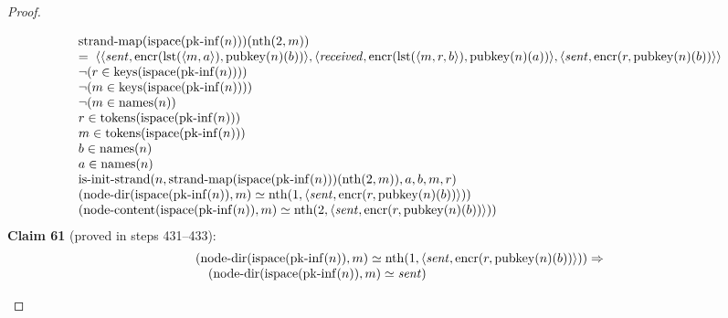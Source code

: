 \documentclass[11pt]{article}
\theoremstyle{plain}
\begin{document}
\begin{proof}
\begin{itemize}[leftmargin=2.8em, itemsep=4pt, parsep=1pt]
\begin{itemize}[leftmargin=2.8em, itemsep=4pt, parsep=1pt]
\begin{equation*}
\begin{array}{@{}l@{}}
\begin{array}{@{}l@{}} \operatorname{strand\text{-}map}(\operatorname{ispace}(\operatorname{pk\text{-}inf}(n)))(\operatorname{nth}(2, m)) \\ =\; \langle \langle \mathit{sent}, \operatorname{encr}(\operatorname{lst}(\langle m, a \rangle), \operatorname{pubkey}(n)(b)) \rangle, \langle \mathit{received}, \operatorname{encr}(\operatorname{lst}(\langle m, r, b \rangle), \operatorname{pubkey}(n)(a)) \rangle, \langle \mathit{sent}, \operatorname{encr}(r, \operatorname{pubkey}(n)(b)) \rangle \rangle \end{array} \\
\neg (r \in \operatorname{keys}(\operatorname{ispace}(\operatorname{pk\text{-}inf}(n)))) \\
\neg (m \in \operatorname{keys}(\operatorname{ispace}(\operatorname{pk\text{-}inf}(n)))) \\
\neg (m \in \operatorname{names}(n)) \\
r \in \operatorname{tokens}(\operatorname{ispace}(\operatorname{pk\text{-}inf}(n))) \\
m \in \operatorname{tokens}(\operatorname{ispace}(\operatorname{pk\text{-}inf}(n))) \\
b \in \operatorname{names}(n) \\
a \in \operatorname{names}(n) \\
\operatorname{is\text{-}init\text{-}strand}(n, \operatorname{strand\text{-}map}(\operatorname{ispace}(\operatorname{pk\text{-}inf}(n)))(\operatorname{nth}(2, m)), a, b, m, r) \\
(\operatorname{node\text{-}dir}(\operatorname{ispace}(\operatorname{pk\text{-}inf}(n)), m) \simeq \operatorname{nth}(1, \langle \mathit{sent}, \operatorname{encr}(r, \operatorname{pubkey}(n)(b)) \rangle)) \\
(\operatorname{node\text{-}content}(\operatorname{ispace}(\operatorname{pk\text{-}inf}(n)), m) \simeq \operatorname{nth}(2, \langle \mathit{sent}, \operatorname{encr}(r, \operatorname{pubkey}(n)(b)) \rangle))
\end{array}
\end{equation*}
\textbf{Claim 61} (proved in steps 431--433):
\begin{equation*}
\begin{array}{@{}l@{}} (\operatorname{node\text{-}dir}(\operatorname{ispace}(\operatorname{pk\text{-}inf}(n)), m) \simeq \operatorname{nth}(1, \langle \mathit{sent}, \operatorname{encr}(r, \operatorname{pubkey}(n)(b)) \rangle)) \Rightarrow  \\ \quad (\operatorname{node\text{-}dir}(\operatorname{ispace}(\operatorname{pk\text{-}inf}(n)), m) \simeq \mathit{sent}) \end{array}
\end{equation*}


\end{itemize}
\end{itemize}
\end{proof}
\end{document}
